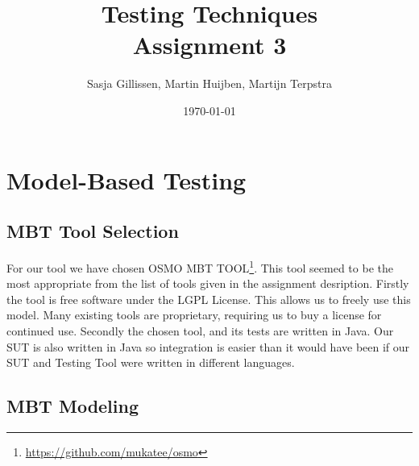 \documentclass[11pt,a4paper]{article}
\author{Sasja Gillissen, Martin Huijben, Martijn Terpstra}
\date{\today}
\title{Testing Techniques\\
  \textbf{Assignment 3}}
\begin{document}
\maketitle




\section{Model-Based Testing}

\subsection{MBT Tool Selection}

For our tool we have chosen OSMO MBT
TOOL\footnote{\url{https://github.com/mukatee/osmo}}.
This tool seemed to be the most appropriate from the list of tools
given in the assignment desription.
Firstly the tool is free software under the LGPL License. This allows
us to freely use this model. Many existing tools are proprietary,
requiring us to buy a license for continued use.
Secondly the chosen tool, and its tests are written in Java. Our SUT
is also written in Java so integration is easier than it would have
been if our SUT and Testing Tool were written in different languages.

\subsection{MBT Modeling}
\end{document}

